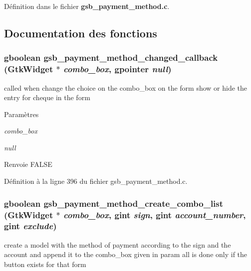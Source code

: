 Définition dans le fichier {\bf gsb\_\-payment\_\-method.c}.



\subsection{Documentation des fonctions}
\subsubsection[{gsb\_\-payment\_\-method\_\-changed\_\-callback}]{\setlength{\rightskip}{0pt plus 5cm}gboolean gsb\_\-payment\_\-method\_\-changed\_\-callback (GtkWidget $\ast$ {\em combo\_\-box}, \/  gpointer {\em null})}\label{gsb__payment__method_8c_a5b947653cf00a61d5afa4870c4c63498}
called when change the choice on the combo\_\-box on the form show or hide the entry for cheque in the form


\begin{DoxyParams}{Paramètres}
\item[{\em combo\_\-box}]\item[{\em null}]\end{DoxyParams}
\begin{DoxyReturn}{Renvoie}
FALSE 
\end{DoxyReturn}


Définition à la ligne 396 du fichier gsb\_\-payment\_\-method.c.

\subsubsection[{gsb\_\-payment\_\-method\_\-create\_\-combo\_\-list}]{\setlength{\rightskip}{0pt plus 5cm}gboolean gsb\_\-payment\_\-method\_\-create\_\-combo\_\-list (GtkWidget $\ast$ {\em combo\_\-box}, \/  gint {\em sign}, \/  gint {\em account\_\-number}, \/  gint {\em exclude})}\label{gsb__payment__method_8c_a161fa2bfbb02f3b3310759b78437586a}
create a model with the method of payment according to the sign and the account and append it to the combo\_\-box given in param all is done only if the button exists for that form


